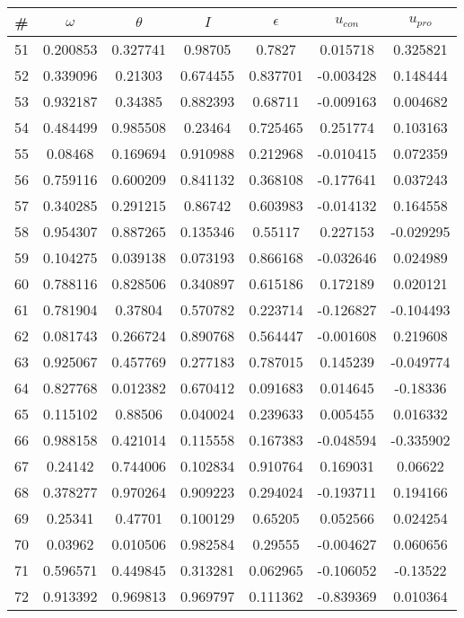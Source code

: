 \newpage
\begin{table}
\begin{tabular}{c|c|c|c|c|c|c}
\# & $\omega$ & $\theta$ & $I$ & $\epsilon$ & $u_{con}$ & $u_{pro}$\\
\hline
51 & 0.200853 & 0.327741 & 0.98705 & 0.7827 & 0.015718 & 0.325821\\
52 & 0.339096 & 0.21303 & 0.674455 & 0.837701 & -0.003428 & 0.148444\\
53 & 0.932187 & 0.34385 & 0.882393 & 0.68711 & -0.009163 & 0.004682\\
54 & 0.484499 & 0.985508 & 0.23464 & 0.725465 & 0.251774 & 0.103163\\
55 & 0.08468 & 0.169694 & 0.910988 & 0.212968 & -0.010415 & 0.072359\\
56 & 0.759116 & 0.600209 & 0.841132 & 0.368108 & -0.177641 & 0.037243\\
57 & 0.340285 & 0.291215 & 0.86742 & 0.603983 & -0.014132 & 0.164558\\
58 & 0.954307 & 0.887265 & 0.135346 & 0.55117 & 0.227153 & -0.029295\\
59 & 0.104275 & 0.039138 & 0.073193 & 0.866168 & -0.032646 & 0.024989\\
60 & 0.788116 & 0.828506 & 0.340897 & 0.615186 & 0.172189 & 0.020121\\
61 & 0.781904 & 0.37804 & 0.570782 & 0.223714 & -0.126827 & -0.104493\\
62 & 0.081743 & 0.266724 & 0.890768 & 0.564447 & -0.001608 & 0.219608\\
63 & 0.925067 & 0.457769 & 0.277183 & 0.787015 & 0.145239 & -0.049774\\
64 & 0.827768 & 0.012382 & 0.670412 & 0.091683 & 0.014645 & -0.18336\\
65 & 0.115102 & 0.88506 & 0.040024 & 0.239633 & 0.005455 & 0.016332\\
66 & 0.988158 & 0.421014 & 0.115558 & 0.167383 & -0.048594 & -0.335902\\
67 & 0.24142 & 0.744006 & 0.102834 & 0.910764 & 0.169031 & 0.06622\\
68 & 0.378277 & 0.970264 & 0.909223 & 0.294024 & -0.193711 & 0.194166\\
69 & 0.25341 & 0.47701 & 0.100129 & 0.65205 & 0.052566 & 0.024254\\
70 & 0.03962 & 0.010506 & 0.982584 & 0.29555 & -0.004627 & 0.060656\\
71 & 0.596571 & 0.449845 & 0.313281 & 0.062965 & -0.106052 & -0.13522\\
72 & 0.913392 & 0.969813 & 0.969797 & 0.111362 & -0.839369 & 0.010364\\

\end{tabular}
\end{table}
